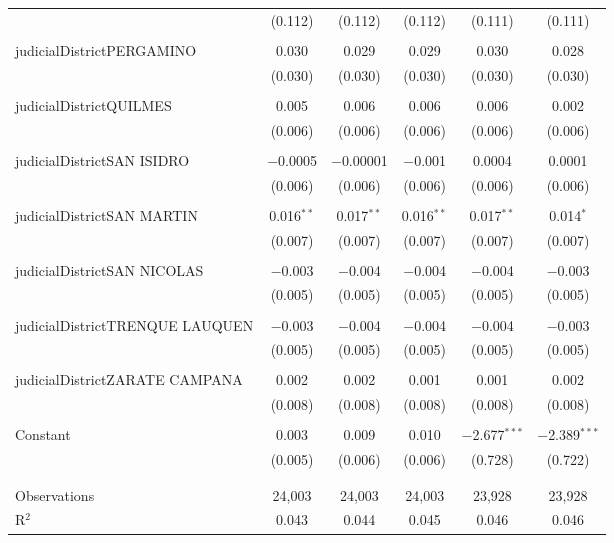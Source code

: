 \documentclass{article}
\begin{document}
\begin{table}[!htbp]
{\begin{tabular}{@{\extracolsep{5pt}}lccccc}
  & (0.112) & (0.112) & (0.112) & (0.111) & (0.111) \\ 
  & & & & & \\ 
 judicialDistrictPERGAMINO & 0.030 & 0.029 & 0.029 & 0.030 & 0.028 \\ 
  & (0.030) & (0.030) & (0.030) & (0.030) & (0.030) \\ 
  & & & & & \\ 
 judicialDistrictQUILMES & 0.005 & 0.006 & 0.006 & 0.006 & 0.002 \\ 
  & (0.006) & (0.006) & (0.006) & (0.006) & (0.006) \\ 
  & & & & & \\ 
 judicialDistrictSAN ISIDRO & $-$0.0005 & $-$0.00001 & $-$0.001 & 0.0004 & 0.0001 \\ 
  & (0.006) & (0.006) & (0.006) & (0.006) & (0.006) \\ 
  & & & & & \\ 
 judicialDistrictSAN MARTIN & 0.016$^{**}$ & 0.017$^{**}$ & 0.016$^{**}$ & 0.017$^{**}$ & 0.014$^{*}$ \\ 
  & (0.007) & (0.007) & (0.007) & (0.007) & (0.007) \\ 
  & & & & & \\ 
 judicialDistrictSAN NICOLAS & $-$0.003 & $-$0.004 & $-$0.004 & $-$0.004 & $-$0.003 \\ 
  & (0.005) & (0.005) & (0.005) & (0.005) & (0.005) \\ 
  & & & & & \\ 
 judicialDistrictTRENQUE LAUQUEN & $-$0.003 & $-$0.004 & $-$0.004 & $-$0.004 & $-$0.003 \\ 
  & (0.005) & (0.005) & (0.005) & (0.005) & (0.005) \\ 
  & & & & & \\ 
 judicialDistrictZARATE CAMPANA & 0.002 & 0.002 & 0.001 & 0.001 & 0.002 \\ 
  & (0.008) & (0.008) & (0.008) & (0.008) & (0.008) \\ 
  & & & & & \\ 
 Constant & 0.003 & 0.009 & 0.010 & $-$2.677$^{***}$ & $-$2.389$^{***}$ \\ 
  & (0.005) & (0.006) & (0.006) & (0.728) & (0.722) \\ 
  & & & & & \\ 
\hline \\[-1.8ex] 
Observations & 24,003 & 24,003 & 24,003 & 23,928 & 23,928 \\ 
R$^{2}$ & 0.043 & 0.044 & 0.045 & 0.046 & 0.046 \\ 

\end{tabular}}
\end{table}
\end{document}
